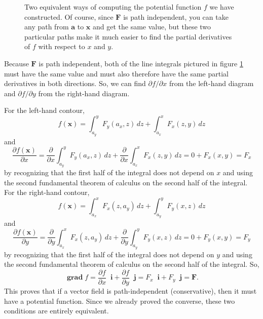 \documentclass{myarticle}
\DeclareMathOperator{\grad}{\mathbf{grad}}
\renewcommand{\vec}[1]{\mathbf{#1}}
\newcommand{\unitvector}[1]{
  \mathop{}\!\vec{#1}
}
\newcommand{\ih}{\unitvector{i}}
\newcommand{\jh}{\unitvector{j}}
\theoremstyle{nospace}
\newtheorem{old series theorem}{Theorem}
\newenvironment{series theorem}{\begin{mdframed}\begin{old series theorem}}{\end{old series theorem}\end{mdframed}}
\begin{document}
\begin{figure}[htb!] \centering
{}
\caption{Two equivalent ways of computing the potential function $f$ we have constructed. Of course, since $\vec{F}$ is path independent, you can take any path from $\vec{a}$ to $\vec{x}$ and get the same value, but these two particular paths make it much easier to find the partial derivatives of $f$ with respect to $x$ and $y$.}
\label{fig:potential function}
\end{figure}

Because $\vec{F}$ is path independent, both of the line integrals pictured in figure \ref{fig:potential function} must have the same value and must also therefore have the same partial derivatives in both directions. So, we can find $\partial f/\partial x$ from the left-hand diagram and $\partial f/\partial y$ from the right-hand diagram.

For the left-hand contour, \[ f(\vec{x}) = \int_{a_y}^y F_y(a_x, z) \,dz + \int_{a_x}^x F_x(z, y) \,dz \] and \[ \frac{\partial f(\vec{x})}{\partial x} = \frac{\partial}{\partial x} \int_{a_y}^y F_y(a_x, z) \,dz + \frac{\partial}{\partial x} \int_{a_x}^x F_x(z, y) \,dz = 0 + F_x(x, y) = F_x \] by recognizing that the first half of the integral does not depend on $x$ and using the second fundamental theorem of calculus on the second half of the integral. For the right-hand contour, \[ f(\vec{x}) = \int_{a_x}^x F_x(z, a_y) \,dz + \int_{a_y}^y F_y(x, z) \,dz \] and \[ \frac{\partial f(\vec{x})}{\partial y} = \frac{\partial}{\partial y} \int_{a_x}^x F_x(z, a_y) \,dz + \frac{\partial}{\partial y} \int_{a_y}^y F_y(x, z) \,dz = 0 + F_y(x, y) = F_y \] by recognizing that the first half of the integral does not depend on $y$ and using the second fundamental theorem of calculus on the second half of the integral. So, \[ \grad f = \frac{\partial f}{\partial x} \ih + \frac{\partial f}{\partial y} \jh = F_x \ih + F_y \jh = \vec{F}. \] This proves that if a vector field is path-independent (conservative), then it must have a potential function. Since we already proved the converse, these two conditions are entirely equivalent.
\end{document}
